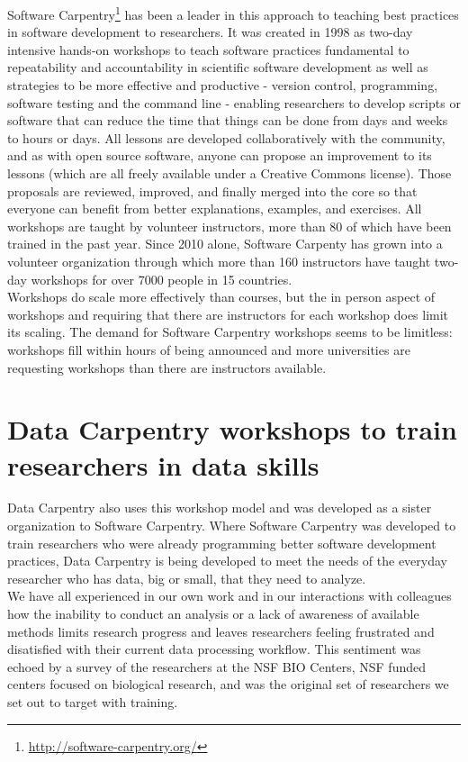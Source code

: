 \documentclass[15]{idcc}
\begin{document}
Software Carpentry\footnote{\url{http://software-carpentry.org/}} has been a leader in this approach to teaching best practices in software development to researchers. It was created in 1998 as two-day
intensive hands-on workshops to teach software practices fundamental to repeatability and accountability in scientific software
development as well as strategies to be more effective and productive - version control, programming, software testing and the command
line - enabling researchers to develop scripts or software that can reduce the time that things can be done from days and weeks to hours
or days. All lessons are developed
collaboratively with the community, and as with open source software, anyone can propose an improvement to its lessons (which are all
freely available under a Creative Commons license).  Those proposals are reviewed, improved, and finally merged into the core so that
everyone can benefit from better explanations, examples, and exercises. All workshops are taught by volunteer instructors, more than 80
of which have been trained in the past year. Since 2010 alone, Software Carpenty has grown into a volunteer organization through which more than 160 instructors have
taught two-day workshops for over 7000 people in 15 countries.\\

Workshops do scale more effectively than courses, but the in person aspect of workshops and requiring that there are instructors
 for each workshop does limit its scaling. The demand for Software Carpentry workshops seems to be limitless:  workshops
fill within hours of being announced and more universities are requesting workshops than there are instructors available.

\section{Data Carpentry workshops to train researchers in data skills}

Data Carpentry also uses this workshop model and was developed as a sister organization to Software Carpentry. Where Software
Carpentry was developed to train researchers who were already programming better software development practices, Data Carpentry is
being developed to meet the needs of the everyday researcher who has data, big or small,
that they need to analyze.\\

We have all experienced in our own work and
in our interactions with colleagues how the inability to conduct an analysis or a lack of awareness of available
methods limits research progress and leaves researchers feeling frustrated and disatisfied with their current data processing workflow. This
sentiment was echoed by a survey of the researchers at the NSF BIO Centers, NSF funded centers focused on biological research, and
was the original set of researchers we set out to target with training.\\
\end{document}
